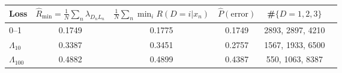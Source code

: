 \begin{tabular}{lccccc}
\toprule
Loss & $\hat{R}_{\min}=\frac1N\sum_n\lambda_{D_nL_n}$ & $\frac1N\sum_n \min_i R(D{=}i|x_n)$ & $\hat P(\text{error})$ & \#$\{D=1,2,3\}$ \\
\midrule
0--1 & 0.1749 & 0.1775 & 0.1749 & 2893, 2897, 4210 \\
$\Lambda_{10}$ & 0.3387 & 0.3451 & 0.2757 & 1567, 1933, 6500 \\
$\Lambda_{100}$ & 0.4882 & 0.4899 & 0.4387 & 550, 1063, 8387 \\
\bottomrule
\end{tabular}
